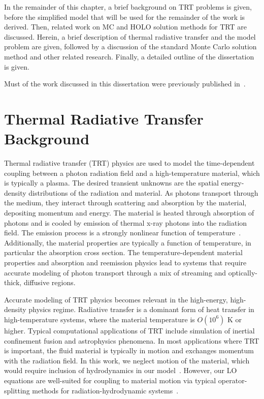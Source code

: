 In the remainder of this chapter, a brief background on TRT problems is given, before the
simplified model that will be used for the remainder of the work is derived.  Then,
related work on MC and HOLO solution methods for TRT are discussed.
 Herein, a brief description of thermal radiative transfer and the
model problem are given, followed by a discussion of the standard Monte Carlo
solution method and other related research.  Finally, a detailed outline of the
dissertation is given.

Must of the work discussed in this dissertation were previously published
in~\cite{bolding_nse}.

\section{Thermal Radiative Transfer Background}

Thermal radiative transfer (TRT) physics are used to model the time-dependent coupling between a photon
radiation field and a high-temperature material, which is typically a plasma.  The desired
transient unknowns are the spatial
energy-density distributions of the radiation and material.  As photons transport through
the medium, they interact through scattering and absorption by the material, depositing
momentum and energy.  The
material is heated through absorption of photons and is cooled by emission of thermal
x-ray photons
into the radiation field.  The emission process is a strongly nonlinear
function of temperature~\cite{mihalas}.  Additionally, the  material properties are
typically a function of temperature, in particular the absorption cross section.  The
temperature-dependent material properties and
absorption and reemission physics lead to systems that require accurate modeling of
photon transport through a mix of
streaming and optically-thick, diffusive regions. 

Accurate modeling of TRT physics becomes relevant in the high-energy,
high-density physics regime.   Radiative transfer is a dominant form of heat transfer in
high-temperature systems, where the material temperature is $O(10^6)$ K or
higher. Typical computational applications of TRT include simulation of inertial confinement fusion and
astrophysics phenomena.  In most applications where TRT is important, the fluid
material is typically in motion and exchanges momentum with the radiation field. In this work, we neglect
motion of the material, which would require inclusion of hydrodynamics in our
model~\cite{mihalas}.  However, our LO equations are well-suited for
coupling to material motion via typical operator-splitting methods for
radiation-hydrodynamic systems~\cite{radhydro_code,os_rh}.

